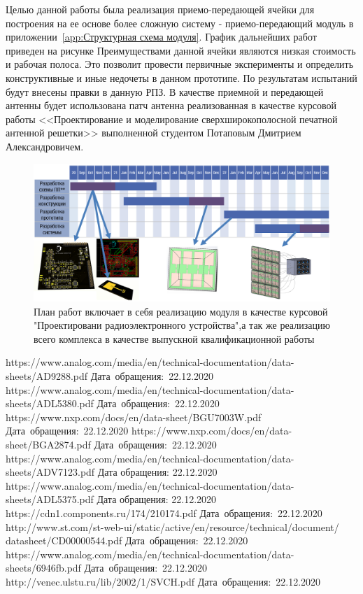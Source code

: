 \documentclass[utf8x, 14pt, oneside, a4paper]{article}
\begin{document}
	Целью данной работы была реализация приемо-передающей ячейки для построения на ее основе более сложную систему - приемо-передающий модуль в приложении~\ref{app:Структурная схема модуля}. График дальнейших работ приведен на рисунке Преимуществами данной ячейки являются низкая стоимость и рабочая полоса. Это позволит провести первичные эксперименты и определить конструктивные и иные недочеты в данном прототипе. По результатам испытаний будут внесены правки в данную РПЗ. В качестве приемной и передающей антенны будет использована патч антенна реализованная в качестве курсовой работы <<Проектирование и моделирование
	сверхширокополосной печатной антенной решетки>> выполненной студентом Потаповым Дмитрием Александровичем. 
	
	\begin{figure}[h!]
		\centering
		\includegraphics[width=0.7\linewidth]{"План работ"}
		\caption{План работ включает в себя реализацию модуля в качестве курсовой "Проектировани радиоэлектронного устройства",а так же реализацию всего комплекса в качестве выпускной квалификационной работы}
		\label{fig:План работ}
	\end{figure}
	
	\pagebreak
	

	
	
	\begin{thebibliography}{3}
		https://www.analog.com/media/en/technical-documentation/data-sheets/AD9288.pdf Дата~обращения:~22.12.2020
		https://www.analog.com/media/en/technical-documentation/data-sheets/ADL5380.pdf Дата~обращения:~22.12.2020
		https://www.nxp.com/docs/en/data-sheet/BGU7003W.pdf Дата~обращения:~22.12.2020
		https://www.nxp.com/docs/en/data-sheet/BGA2874.pdf Дата~обращения:~22.12.2020
		https://www.analog.com/media/en/technical-documentation/data-sheets/ADV7123.pdf Дата обращения: 22.12.2020
		https://www.analog.com/media/en/technical-documentation/data-sheets/ADL5375.pdf Дата обращения: 22.12.2020
		https://cdn1.components.ru/174/210174.pdf Дата~обращения:~22.12.2020
		http://www.st.com/st-web-ui/static/active/en/resource/technical/document/ datasheet/CD00000544.pdf Дата~обращения:~22.12.2020
		https://www.analog.com/media/en/technical-documentation/data-sheets/6946fb.pdf Дата~обращения:~22.12.2020
		http://venec.ulstu.ru/lib/2002/1/SVCH.pdf Дата~обращения:~22.12.2020

	\end{thebibliography}
	
\end{document}
